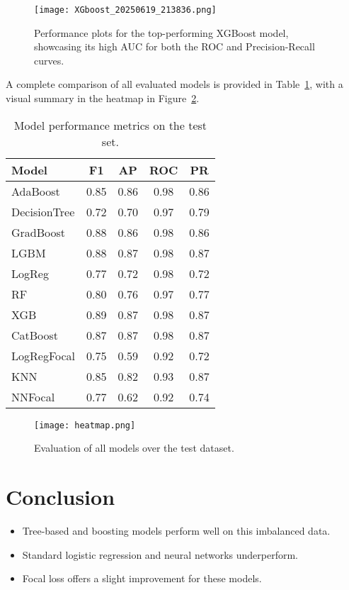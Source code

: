 \documentclass[10pt,a4paper,twocolumn,twoside]{tau-class/tau}
\begin{document}
\begin{figure}[htbp]
    \centering
    \texttt{[image: XGboost\_20250619\_213836.png]}
    \caption{Performance plots for the top-performing XGBoost model, showcasing its high AUC for both the ROC and Precision-Recall curves.}
    \label{fig:xgboost_results}
\end{figure}

A complete comparison of all evaluated models is provided in Table~\ref{tab:model_performance}, with a visual summary in the heatmap in Figure~\ref{fig:heatmap-models}.

\begin{table}[htbp]
\centering
\caption{Model performance metrics on the test set.}
\label{tab:model_performance}
\begin{tabular}{lcccc}
\toprule
\textbf{Model} & \textbf{F1} & \textbf{AP} & \textbf{ROC} & \textbf{PR} \\
\midrule
AdaBoost      & 0.85 & 0.86 & 0.98 & 0.86 \\
DecisionTree  & 0.72 & 0.70 & 0.97 & 0.79 \\
GradBoost     & 0.88 & 0.86 & 0.98 & 0.86 \\
LGBM          & 0.88 & 0.87 & 0.98 & 0.87 \\
LogReg        & 0.77 & 0.72 & 0.98 & 0.72 \\
RF            & 0.80 & 0.76 & 0.97 & 0.77 \\
XGB           & 0.89 & 0.87 & 0.98 & 0.87 \\
CatBoost      & 0.87 & 0.87 & 0.98 & 0.87 \\
LogRegFocal   & 0.75 & 0.59 & 0.92 & 0.72 \\
KNN           & 0.85 & 0.82 & 0.93 & 0.87 \\
NNFocal       & 0.77 & 0.62 & 0.92 & 0.74 \\
\bottomrule
\end{tabular}
\end{table}

\begin{figure}[htbp]
    \centering
    \texttt{[image: heatmap.png]}
    \caption{Evaluation of all models over the test dataset.}
    \label{fig:heatmap-models}
\end{figure}

\section{Conclusion}
\begin{itemize}[noitemsep]
    \item Tree-based and boosting models perform well on this imbalanced data.
    \item Standard logistic regression and neural networks underperform.
    \item Focal loss offers a slight improvement for these models.
\end{itemize}
\end{document}
